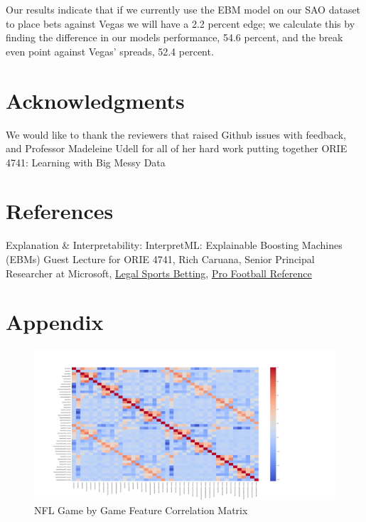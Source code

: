 \documentclass{article}
\begin{document}
\begin{multicols}{2}
Our results indicate that if we currently use the EBM model on our SAO dataset to place bets against Vegas we will have a 2.2 percent edge;  we calculate this by finding the difference in our models performance, 54.6 percent, and the break even point against Vegas’ spreads, 52.4 percent. 
\section*{Acknowledgments}
We would like to thank the reviewers that raised Github issues with feedback, and Professor Madeleine Udell for all of her hard work putting together ORIE 4741: Learning with Big Messy Data
\section*{References}
Explanation & Interpretability: InterpretML: Explainable Boosting Machines (EBMs) Guest Lecture for ORIE 4741, Rich Caruana, Senior Principal Researcher at Microsoft,
\href{https://www.legalsportsbetting.com/how-much-money-do-americans-bet-on-sports/}{\underline{Legal Sports Betting}},
\href{https://www.pro-football-reference.com/teams/buf/2019.htm}{\underline{Pro Football Reference}}
\pagebreak
\end{multicols}

\section{Appendix}
\begin{figure}[h!]
\centering 
 \includegraphics[width=\linewidth]{figs_final/heat_map.png}
 \caption{NFL Game by Game Feature Correlation Matrix}
\label{fig:real}
\end{figure}
\end{document}
